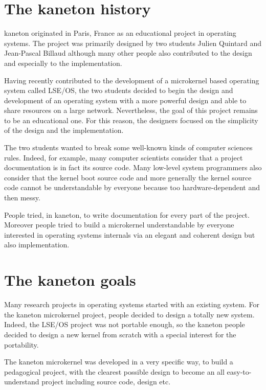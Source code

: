 \begin{multicols}{2}

%
%

\section{The kaneton history}

kaneton originated in Paris, France as an educational project in operating
systems. The project was primarily designed by two students Julien Quintard
and Jean-Pascal Billaud although many other people also contributed to
the design and especially to the implementation.

Having recently contributed to the development of a microkernel based
operating system called LSE/OS, the two students decided to begin the
design and development of an operating system with a more powerful design
and able to share resources on a large network. Nevertheless, the goal of
this project remains to be an educational one. For this reason, the
designers focused on the simplicity of the design and the implementation.

The two students wanted to break some well-known kinds of computer sciences
rules. Indeed, for example, many computer scientists consider that a
project documentation is in fact its source code. Many low-level system
programmers also consider that the kernel boot source code and more
generally the kernel source code cannot be understandable by everyone
because too hardware-dependent and then messy.

People tried, in kaneton, to write documentation for every part of the
project. Moreover people tried to build a microkernel understandable
by everyone interested in operating systems internals via an elegant
and coherent design but also implementation.

%
%

\section{The kaneton goals}

Many research projects in operating systems started with an existing system.
For the kaneton microkernel project, people decided to design a totally
new system. Indeed, the LSE/OS project was not portable enough, so the
kaneton people decided to design a new kernel from scratch with a
special interest for the portability.

The kaneton microkernel was developed in a very specific way, to build
a pedagogical project, with the clearest possible design to become an
all easy-to-understand project including source code, design etc.


\end{multicols}
